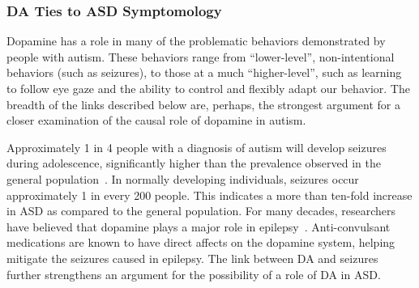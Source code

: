 \documentclass[man]{apa}
\begin{document}

\subsubsection{DA Ties to ASD Symptomology}
	Dopamine has a role in many of the problematic behaviors demonstrated by people with autism.  These behaviors range from “lower-level”, non-intentional behaviors (such as seizures), to those at a much “higher-level”, such as learning to follow eye gaze and the ability to control and flexibly adapt our behavior.  The breadth of the links described below are, perhaps, the strongest argument for a closer examination of the causal role of dopamine in autism.

Approximately 1 in 4 people with a diagnosis of autism will develop seizures during adolescence, significantly higher than the prevalence observed in the general population~\cite{RefWorks:102}.  In normally developing individuals, seizures occur approximately 1 in every 200 people. This indicates a more than ten-fold increase in ASD as compared to the general population.  For many decades, researchers have believed that dopamine plays a major role in epilepsy~\cite{RefWorks:1}.  Anti-convulsant medications are known to have direct affects on the dopamine system, helping mitigate the seizures caused in epilepsy.  The link between DA and seizures further strengthens an argument for the possibility of a role of DA in ASD.
\end{document}
